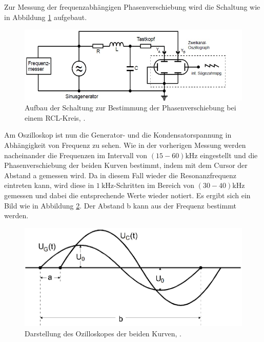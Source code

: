 Zur Messung der frequenzabhängigen Phasenverschiebung wird die Schaltung wie in Abbildung \ref{fig:freqab} aufgebaut. 
\begin{figure}[h!]
	\centering
	\includegraphics[width=0.7\linewidth]{freqab.jpg}
	\caption{Aufbau der Schaltung zur Bestimmung der Phasenverschiebung bei einem RCL-Kreis, \cite[13]{anleitung354}.}
	\label{fig:freqab}
\end{figure}
Am Oszilloskop ist nun die Generator- und die Kondensatorspannung in Abhängigkeit von Frequenz zu sehen. Wie in der vorherigen Messung werden nacheinander die Frequenzen im Intervall 
von $(15-60)\si{\kHz}$ eingestellt und die Phasenverschiebung der beiden Kurven bestimmt, indem mit dem Cursor der Abstand a gemessen wird. Da in diesem Fall wieder die Resonanzfrequenz eintreten kann, wird diese 
in $\SI{1}{\kHz}$-Schritten im Bereich von $(30-40)\si{\kHz}$ gemessen und dabei die entsprechende Werte wieder notiert. Es ergibt sich ein Bild wie in Abbildung \ref{fig:abstaende}. Der Abstand b kann aus der Frequenz
bestimmt werden.
\begin{figure}[h!]
	\centering
	\includegraphics[width=0.7\linewidth]{Abstaende.png}
	\caption{Darstellung des Ozilloskopes der beiden Kurven, \cite[7]{anleitung353}.}
	\label{fig:abstaende}
\end{figure}

